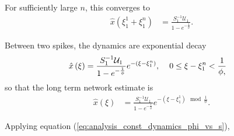 \begin{enumerate}
For sufficiently large $n$, this converges to 
\begin{align*}
\hat
{
	x
}
\left(
	\xi_1^1 + \xi_1^n
\right)
&=
\frac
{
	S^{-1}_1 \mathcal{U}_1
}
{
	1 - e^
	{
		-\frac
		{
			1
		}
		{
			\phi
		}
	}
}.
\end{align*}

Between two spikes, the dynamics are exponential decay
\begin{align*}
\hat{
	x
}
\left(
	\xi
\right)
&=
\frac
{
S^{-1}_1 \mathcal{U}_1
}
{
	1 - e^
	{
		-\frac
		{
			1
		}
		{
			\phi
		}
	}
}
e^
{
	-\left(
		\xi - \xi_1^n
	\right)
}
,
\hspace{4mm}
0 \leq \xi - \xi_1^n  < 
\frac
{
	1
}
{
	\phi
,}
\end{align*}
so that the long term network estimate is
\begin{align*}
\label{eq:analysis:constant_driving_constant_dynamics_estimate_equation_implicit}
\hat{
x
}
\left(
	\xi
\right)
&=
\frac
{
	S^{-1}_1 \mathcal{U}_1
}
{
	1 - e^
	{
		-\frac
		{
			1
		}
		{
			\phi
		}
	}
}
e^
{
	- (\xi - \xi_1^1) 
	\mod
	{
		\frac
		{
			1
		}
		{
			\phi
		}
	}
}.
\end{align*}

Applying equation (\ref{eq:analysis_const_dynamics_phi_vs_s}),


\end{enumerate}
